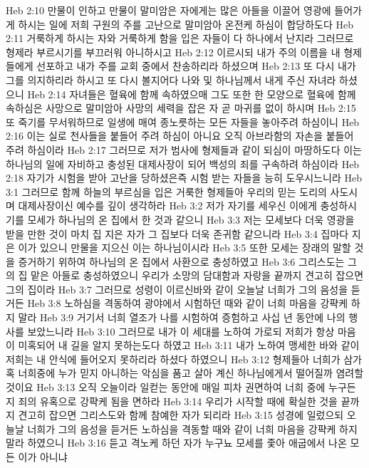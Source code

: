Heb 2:10  만물이 인하고 만물이 말미암은 자에게는 많은 아들을 이끌어 영광에 들어가게 하시는 일에 저희 구원의 주를 고난으로 말미암아 온전케 하심이 합당하도다
Heb 2:11  거룩하게 하시는 자와 거룩하게 함을 입은 자들이 다 하나에서 난지라 그러므로 형제라 부르시기를 부끄러워 아니하시고
Heb 2:12  이르시되 내가 주의 이름을 내 형제들에게 선포하고 내가 주를 교회 중에서 찬송하리라 하셨으며
Heb 2:13  또 다시 내가 그를 의지하리라 하시고 또 다시 볼지어다 나와 및 하나님께서 내게 주신 자녀라 하셨으니
Heb 2:14  자녀들은 혈육에 함께 속하였으매 그도 또한 한 모양으로 혈육에 함께 속하심은 사망으로 말미암아 사망의 세력을 잡은 자 곧 마귀를 없이 하시며
Heb 2:15  또 죽기를 무서워하므로 일생에 매여 종노릇하는 모든 자들을 놓아주려 하심이니
Heb 2:16  이는 실로 천사들을 붙들어 주려 하심이 아니요 오직 아브라함의 자손을 붙들어 주려 하심이라
Heb 2:17  그러므로 저가 범사에 형제들과 같이 되심이 마땅하도다 이는 하나님의 일에 자비하고 충성된 대제사장이 되어 백성의 죄를 구속하려 하심이라
Heb 2:18  자기가 시험을 받아 고난을 당하셨은즉 시험 받는 자들을 능히 도우시느니라
Heb 3:1  그러므로 함께 하늘의 부르심을 입은 거룩한 형제들아 우리의 믿는 도리의 사도시며 대제사장이신 예수를 깊이 생각하라
Heb 3:2  저가 자기를 세우신 이에게 충성하시기를 모세가 하나님의 온 집에서 한 것과 같으니
Heb 3:3  저는 모세보다 더욱 영광을 받을 만한 것이 마치 집 지은 자가 그 집보다 더욱 존귀함 같으니라
Heb 3:4  집마다 지은 이가 있으니 만물을 지으신 이는 하나님이시라
Heb 3:5  또한 모세는 장래의 말할 것을 증거하기 위하여 하나님의 온 집에서 사환으로 충성하였고
Heb 3:6  그리스도는 그의 집 맡은 아들로 충성하였으니 우리가 소망의 담대함과 자랑을 끝까지 견고히 잡으면 그의 집이라
Heb 3:7  그러므로 성령이 이르신바와 같이 오늘날 너희가 그의 음성을 듣거든
Heb 3:8  노하심을 격동하여 광야에서 시험하던 때와 같이 너희 마음을 강퍅케 하지 말라
Heb 3:9  거기서 너희 열조가 나를 시험하여 증험하고 사십 년 동안에 나의 행사를 보았느니라
Heb 3:10  그러므로 내가 이 세대를 노하여 가로되 저희가 항상 마음이 미혹되어 내 길을 알지 못하는도다 하였고
Heb 3:11  내가 노하여 맹세한 바와 같이 저희는 내 안식에 들어오지 못하리라 하셨다 하였으니
Heb 3:12  형제들아 너희가 삼가 혹 너희중에 누가 믿지 아니하는 악심을 품고 살아 계신 하나님에게서 떨어질까 염려할 것이요
Heb 3:13  오직 오늘이라 일컫는 동안에 매일 피차 권면하여 너희 중에 누구든지 죄의 유혹으로 강퍅케 됨을 면하라
Heb 3:14  우리가 시작할 때에 확실한 것을 끝까지 견고히 잡으면 그리스도와 함께 참예한 자가 되리라
Heb 3:15  성경에 일렀으되 오늘날 너희가 그의 음성을 듣거든 노하심을 격동할 때와 같이 너희 마음을 강퍅케 하지 말라 하였으니
Heb 3:16  듣고 격노케 하던 자가 누구뇨 모세를 좇아 애굽에서 나온 모든 이가 아니냐
